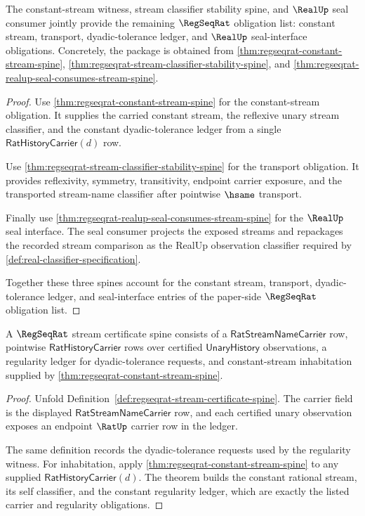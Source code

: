 \begin{theorem}
\label{thm:regseqrat-seal-ledger-obligation-package}
The constant-stream witness, stream classifier stability spine, and
$\RealUp$ seal consumer jointly provide the remaining $\RegSeqRat$ obligation
list: constant stream, transport, dyadic-tolerance ledger, and $\RealUp$
seal-interface obligations. Concretely, the package is obtained from
\autoref{thm:regseqrat-constant-stream-spine},
\autoref{thm:regseqrat-stream-classifier-stability-spine}, and
\autoref{thm:regseqrat-realup-seal-consumes-stream-spine}.
\end{theorem}
\begin{proof}
Use \autoref{thm:regseqrat-constant-stream-spine} for the constant-stream
obligation. It supplies the carried constant stream, the reflexive unary stream
classifier, and the constant dyadic-tolerance ledger from a single
$\mathsf{RatHistoryCarrier}(d)$ row.

Use \autoref{thm:regseqrat-stream-classifier-stability-spine} for the
transport obligation. It provides reflexivity, symmetry, transitivity,
endpoint carrier exposure, and the transported stream-name classifier after
pointwise $\hsame$ transport.

Finally use \autoref{thm:regseqrat-realup-seal-consumes-stream-spine} for the
$\RealUp$ seal interface. The seal consumer projects the exposed streams and
repackages the recorded stream comparison as the RealUp observation classifier
required by \autoref{def:real-classifier-specification}.

Together these three spines account for the constant stream, transport,
dyadic-tolerance ledger, and seal-interface entries of the paper-side
$\RegSeqRat$ obligation list.
\end{proof}

\begin{theorem}
\label{thm:regseqrat-obligation-carrier}
A $\RegSeqRat$ stream certificate spine consists of a
$\mathsf{RatStreamNameCarrier}$ row, pointwise
$\mathsf{RatHistoryCarrier}$ rows over certified
$\mathsf{UnaryHistory}$ observations, a regularity ledger for
dyadic-tolerance requests, and constant-stream inhabitation supplied by
\autoref{thm:regseqrat-constant-stream-spine}.
\end{theorem}
\begin{proof}
Unfold Definition~\ref{def:regseqrat-stream-certificate-spine}. The carrier
field is the displayed $\mathsf{RatStreamNameCarrier}$ row, and each certified
unary observation exposes an endpoint $\RatUp$ carrier row in the ledger.

The same definition records the dyadic-tolerance requests used by the
regularity witness. For inhabitation, apply
\autoref{thm:regseqrat-constant-stream-spine} to any supplied
$\mathsf{RatHistoryCarrier}(d)$. The theorem builds the constant rational
stream, its self classifier, and the constant regularity ledger, which are
exactly the listed carrier and regularity obligations.
\end{proof}

